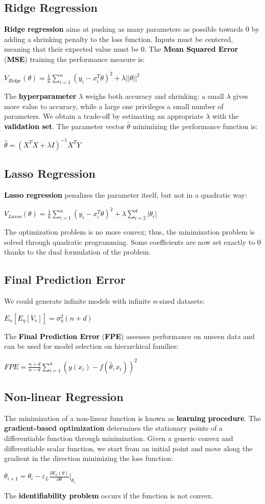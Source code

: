 \documentclass{article}
\newcommand{\bb}[1]{\textcolor{black}{\textbf{#1}}}
\newcommand{\rr}[1]{\textcolor{black}{#1}}
\newcommand{\cc}[1]{\begin{center}\textcolor{black}{#1}\end{center}}
\begin{document}
\subsection{Ridge Regression}
\bb{Ridge regression} aims at pushing as many parameters as possible towards \rr{$0$} by adding a shrinking penalty to the loss function. Inputs must be centered, meaning that their expected value must be \rr{$0$}. The \bb{Mean Squared Error} (\bb{MSE}) training the performance measure is:
\cc{$V_{Ridge}(\theta)=\displaystyle\frac{1}{n}\displaystyle\sum^n_{i=1}(y_i-x^T_i\theta)^2+\lambda||\theta||^2$}
The \bb{hyperparameter} \rr{$\lambda$} weighs both accuracy and shrinking: a small \rr{$\lambda$} gives more value to accuracy, while a large one privileges a small number of parameters. We obtain a trade-off by estimating an appropriate \rr{$\lambda$} with the \bb{validation set}. The parameter vector \rr{$\hat{\theta}$} minimizing the performance function is:
\cc{$\hat{\theta} = (X^TX+\lambda I)^{-1}X^TY$}

\subsection{Lasso Regression}
\bb{Lasso regression} penalizes the parameter itself, but not in a quadratic way:
\cc{$V_{Lasso}(\theta)=\displaystyle\frac{1}{n}\displaystyle\sum^n_{i=1}(y_i-x^T_i\theta)^2+\lambda\displaystyle\sum^d_{i=2}|\theta_i|$}
The optimization problem is no more convex; thus, the minimization problem is solved through quadratic programming. Some coefficients are now set exactly to \rr{$0$} thanks to the dual formulation of the problem.

\subsection{Final Prediction Error}
We could generate infinite models with infinite \rr{$n$}-sized datasets:
\cc{$E_n[E_\eta[V_v]] = \sigma_\eta^2(n+d)$}
The \bb{Final Prediction Error} (\bb{FPE}) assesses performance on unseen data and can be used for model selection on hierarchical families:
\cc{$FPE = \displaystyle\frac{n+d}{n-d}\displaystyle\sum^n_{i=1}(y(x_i) - f(\hat{\theta}, x_i))^2$}

\subsection{Non-linear Regression}
The minimization of a non-linear function is known as \bb{learning procedure}. The \textbf{gradient-based optimization} determines the stationary points of a differentiable function through minimization. Given a generic convex and differentiable scalar function, we start from an initial point and move along the gradient in the direction minimizing the loss function:
\cc{$\theta_{i+1} = \theta_i - \varepsilon_L \displaystyle\frac{\partial V_n(\theta)}{\partial\theta}|_{\theta_i}$}
The \bb{identifiability problem} occurs if the function is not convex.
\end{document}
